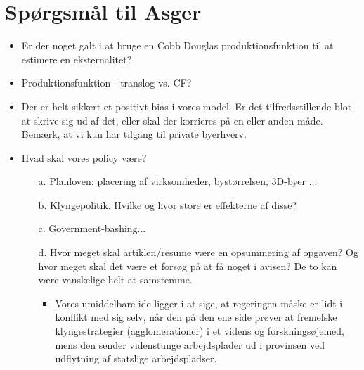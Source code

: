 \section{Spørgsmål til Asger}
\begin{itemize}
	\item Er der noget galt i at bruge en Cobb Douglas produktionsfunktion til at estimere en eksternalitet?
	\item Produktionsfunktion - translog vs. CF?
	\item Der er helt sikkert et positivt bias i vores model. Er det tilfredsstillende blot at skrive sig ud af det, eller skal der korrieres på en eller anden måde. Bemærk, at vi kun har tilgang til private byerhverv.
	\item Hvad skal vores policy være?
	\begin{itemize}
	 	\item[a.] Planloven: placering af virksomheder, bystørrelsen, 3D-byer ...
	 	\item[b.] Klyngepolitik. Hvilke og hvor store er effekterne af disse?
	 	\item[c.] Government-bashing...
	 	\item[d.] Hvor meget skal artiklen/resume være en opsummering af opgaven? Og hvor meget skal det være et forsøg på at få noget i avisen? De to kan være vanskelige helt at samstemme.
	 	\begin{itemize}
	 		\item Vores umiddelbare ide ligger i at sige, at regeringen måske er lidt i konflikt med sig selv, når den på den ene side prøver at fremelske klyngestrategier (agglomerationer) i et videns og forskningsøjemed, mens den sender videnstunge arbejdsplader ud i provinsen ved udflytning af statslige arbejdspladser.
	 	\end{itemize}
	 \end{itemize} 
\end{itemize}